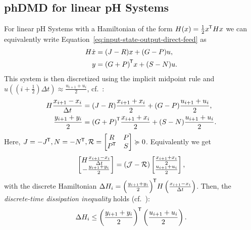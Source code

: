 \subsection{phDMD for linear pH Systems}

For linear pH Systems with a Hamiltonian of the form $H(x) = \frac{1}{2} x^{\mkern-1.5mu \mathsf{T}} H x$ we can equivalently write Equation~\eqref{eq:input-state-output-direct-feed} as
\begin{equation}\label{eq:lin-ph-system}
    \begin{aligned}
        H \dot{x} &= (J - R) x + (G - P) u, \\
        y &= {(G + P)}^{\mkern-1.5mu \mathsf{T}} x + (S - N) u.
    \end{aligned}
\end{equation}
This system is then discretized using the implicit midpoint rule and $u((i + \frac{1}{2}) \Delta t) \approx \frac{u_{i + 1} + u_i}{2}$, cf.~\cite{Morandin2022}:
\begin{equation}\label{eq:discrete-lin-ph-system}
    \begin{aligned}
        H \frac{x_{i + 1} - x_i}{\Delta t} &= (J - R) \frac{x_{i + 1} + x_i}{2} + (G - P) \frac{u_{i + 1} + u_i}{2}, \\
        \frac{y_{i + 1} + y_i}{2} &= {(G + P)}^{\mkern-1.5mu \mathsf{T}} \frac{x_{i + 1} + x_i}{2} + (S - N) \frac{u_{i + 1} + u_i}{2}.
    \end{aligned}
\end{equation}
Here, $J = -J^{\mkern-1.5mu \mathsf{T}}, N = -N^{\mkern-1.5mu \mathsf{T}}, \mathcal{R} = \begin{bmatrix}
    R & P \\
    P^{\mkern-1.5mu \mathsf{T}} & S
\end{bmatrix} \succcurlyeq 0$.
Equivalently we get
\begin{equation}\label{eq:disc-lin-ph-block-structure}
    \begin{bmatrix}
        H \frac{x_{i + 1} - x_i}{\Delta t} \\
        -\frac{y_{i + 1} + y_i}{2}
    \end{bmatrix}
    = (\mathcal{J} - \mathcal{R}) \begin{bmatrix}
        \frac{x_{i + 1} + x_i}{2} \\
        \frac{u_{i + 1} + u_i}{2}
    \end{bmatrix},
\end{equation}
with the discrete Hamiltonian $\Delta H_i = {\left( \frac{y_{i + 1} + y_i}{2} \right)}^{\mkern-1.5mu \mathsf{T}} H \left( \frac{x_{i + 1} - x_i}{\Delta t} \right)$.
Then, the \emph{discrete-time dissipation inequality} holds (cf.~\cite[Lemma~2.6]{Morandin2022}):
\begin{equation}
    \Delta H_i \leq {\left( \frac{y_{i + 1} + y_i}{2} \right)}^{\mkern-1.5mu \mathsf{T}} \left( \frac{u_{i + 1} + u_i}{2} \right).
\end{equation}


